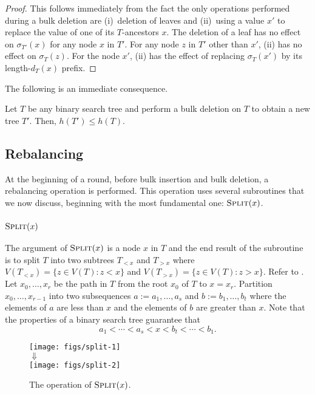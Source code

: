 \documentclass[kpfonts]{patmorin}
\let\le\leqslant
\begin{document}
\begin{proof}
  This follows immediately from the fact the only operations performed during a bulk deletion are (i)~deletion of leaves and (ii)~using a value $x'$ to replace the value of one of its $T$-ancestors $x$.  The deletion of a leaf has no effect on $\sigma_{T'}(x)$ for any node $x$ in $T'$.  For any node $z$ in $T'$ other than $x'$, (ii) has no effect on $\sigma_T(z)$.  For the node $x'$, (ii) has the effect of replacing $\sigma_T(x')$ by its length-$d_T(x)$ prefix.  
\end{proof}

The following is an immediate consequence. 

\begin{lem}
  Let $T$ be any binary search tree and perform a bulk deletion on $T$ to obtain a new tree $T'$.  Then, $h(T')\le h(T)$.
\end{lem}


\subsection{Rebalancing}

At the beginning of a round, before bulk insertion and bulk deletion, a rebalancing operation is performed.  This operation uses several subroutines that we now discuss, beginning with the most fundamental one:  $\textsc{Split}(x)$.

\subsubsection{$\textsc{Split}(x)$}

The argument of $\textsc{Split}(x)$ is a node $x$ in $T$ and the end result of the subroutine is to split $T$ into two subtrees $T_{<x}$ and $T_{>x}$ where $V(T_{<x})=\{z\in V(T): z<x\}$ and $V(T_{>x})=\{z\in V(T): z>x\}$. Refer to .  Let $x_0,\ldots,x_r$ be the path in $T$ from the root $x_0$ of $T$ to $x=x_r$.  Partition $x_0,\ldots,x_{r-1}$ into two subsequences $a:=a_1,\ldots,a_s$ and $b:=b_1,\ldots,b_t$ where the elements of $a$ are less than $x$ and the elements of $b$ are greater than $x$.
Note that the properties of a binary search tree guarantee that
\[
a_1 < \cdots < a_s < x < b_t < \cdots < b_1.
\]
\begin{figure}
  \begin{center}
    \texttt{[image: figs/split-1]} \\[1ex]
    $\Downarrow$ \\[1ex]
    \texttt{[image: figs/split-2]}
  \end{center}
  \caption{The operation of $\textsc{Split}(x)$.}
\end{figure}
\end{document}
